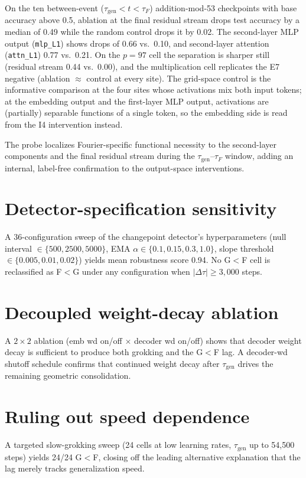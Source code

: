 \documentclass[12pt,openany,a4paper]{book}
\newcommand{\taug}{\tau_{\mathrm{gen}}}
\newcommand{\tauf}{\tau_{F}}
\newcommand{\Dtau}{\Delta\tau}
\begin{document}
On the ten between-event ($\taug < t < \tauf$) addition-mod-53 checkpoints with base accuracy above 0.5, ablation at the final residual stream drops test accuracy by a median of 0.49 while the random control drops it by 0.02. The second-layer MLP output (\texttt{mlp\_L1}) shows drops of 0.66 vs.\ 0.10, and second-layer attention (\texttt{attn\_L1}) 0.77 vs.\ 0.21. On the $p=97$ cell the separation is sharper still (residual stream 0.44 vs.\ 0.00), and the multiplication cell replicates the E7 negative (ablation $\approx$ control at every site). The grid-space control is the informative comparison at the four sites whose activations mix both input tokens; at the embedding output and the first-layer MLP output, activations are (partially) separable functions of a single token, so the embedding side is read from the I4 intervention instead.

The probe localizes Fourier-specific functional necessity to the second-layer components and the final residual stream during the $\taug$--$\tauf$ window, adding an internal, label-free confirmation to the output-space interventions.

\section{Detector-specification sensitivity}

A 36-configuration sweep of the changepoint detector's hyperparameters (null interval $\in \{500, 2500, 5000\}$, EMA $\alpha \in \{0.1, 0.15, 0.3, 1.0\}$, slope threshold $\in \{0.005, 0.01, 0.02\}$) yields mean robustness score 0.94. No G$<$F cell is reclassified as F$<$G under any configuration when $|\Dtau| \geq 3{,}000$ steps.

\section{Decoupled weight-decay ablation}

A $2 \times 2$ ablation (emb wd on/off $\times$ decoder wd on/off) shows that decoder weight decay is sufficient to produce both grokking and the G$<$F lag. A decoder-wd shutoff schedule confirms that continued weight decay after $\taug$ drives the remaining geometric consolidation.

\section{Ruling out speed dependence}

A targeted slow-grokking sweep (24 cells at low learning rates, $\taug$ up to 54,500 steps) yields 24/24 G$<$F, closing off the leading alternative explanation that the lag merely tracks generalization speed.
\end{document}
